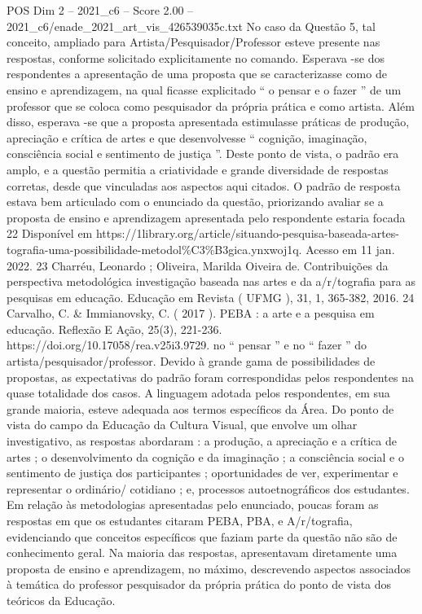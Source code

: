 \begin{textsample}{POS Dim 2 – 2021\_c6 – Score 2.00 – 2021\_c6/enade\_2021\_art\_vis\_426539035c.txt}
No caso da Questão 5, tal conceito, ampliado para Artista/Pesquisador/Professor esteve presente nas respostas, conforme solicitado explicitamente no comando.
Esperava -se dos respondentes a apresentação de uma proposta que se caracterizasse como de ensino e aprendizagem, na qual ficasse explicitado “ o pensar e o fazer ” de um professor que se coloca como pesquisador da própria prática e como artista.
Além disso, esperava -se que a proposta apresentada estimulasse práticas de produção, apreciação e crítica de artes e que desenvolvesse “ cognição, imaginação, consciência social e sentimento de justiça ”.
Deste ponto de vista, o padrão era amplo, e a questão permitia a criatividade e grande diversidade de respostas corretas, desde que vinculadas aos aspectos aqui citados.
O padrão de resposta estava bem articulado com o enunciado da questão, priorizando avaliar se a proposta de ensino e aprendizagem apresentada pelo respondente estaria focada 22 Disponível em https://1library.org/article/situando-pesquisa-baseada-artes-tografia-uma-possibilidade-metodol\%C3\%B3gica.ynxwoj1q.
Acesso em 11 jan. 2022. 23 Charréu, Leonardo ; Oliveira, Marilda Oiveira de.
Contribuições da perspectiva metodológica investigação baseada nas artes e da a/r/tografia para as pesquisas em educação.
Educação em Revista ( UFMG ), 31, 1, 365-382, 2016. 24 Carvalho, C. \& Immianovsky, C. ( 2017 ).
PEBA : a arte e a pesquisa em educação.
Reflexão E Ação, 25(3), 221-236. https://doi.org/10.17058/rea.v25i3.9729. no “ pensar ” e no “ fazer ” do artista/pesquisador/professor.
Devido à grande gama de possibilidades de propostas, as expectativas do padrão foram correspondidas pelos respondentes na quase totalidade dos casos.
A linguagem adotada pelos respondentes, em sua grande maioria, esteve adequada aos termos específicos da Área.
Do ponto de vista do campo da Educação da Cultura Visual, que envolve um olhar investigativo, as respostas abordaram : a produção, a apreciação e a crítica de artes ; o desenvolvimento da cognição e da imaginação ; a consciência social e o sentimento de justiça dos participantes ; oportunidades de ver, experimentar e representar o ordinário/ cotidiano ; e, processos autoetnográficos dos estudantes.
Em relação às metodologias apresentadas pelo enunciado, poucas foram as respostas em que os estudantes citaram PEBA, PBA, e A/r/tografia, evidenciando que conceitos específicos que faziam parte da questão não são de conhecimento geral.
Na maioria das respostas, apresentavam diretamente uma proposta de ensino e aprendizagem, no máximo, descrevendo aspectos associados à temática do professor pesquisador da própria prática do ponto de vista dos teóricos da Educação.

\end{textsample}
